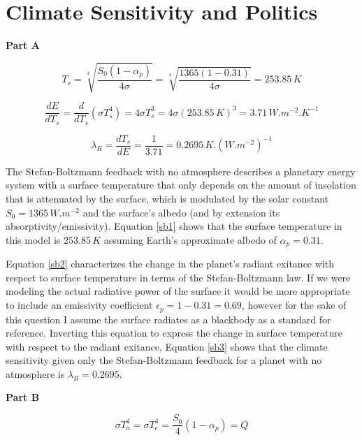\documentclass[12pt]{article}
\begin{document}
\section{Climate Sensitivity and Politics}

\noindent\textbf{Part A}

\begin{equation}\label{sb1}
    T_s = \sqrt[4]{\frac{S_0 (1-\alpha_p)}{4 \sigma}} = \sqrt[4]{\frac{1365 (1-0.31)}{4 \sigma}} = 253.85\,\si{K}
\end{equation}

\begin{equation}\label{sb2}
    \frac{d E}{d T_s} =  \frac{d}{dT_s}(\sigma T_s^4) = 4\sigma T_s^3 = 4 \sigma (253.85\,\si{K})^3 = 3.71\,\si{W.m^{-2}.K^{-1}}
\end{equation}

\begin{equation}\label{sb3}
    \lambda_R = \frac{d T_s}{d E} = \frac{1}{3.71} = 0.2695\,\si{K.(W.m^{-2})^{-1}}
\end{equation}

The Stefan-Boltzmann feedback with no atmosphere describes a planetary energy system with a surface temperature that only depends on the amount of insolation that is attenuated by the surface, which is modulated by the solar constant $S_0 = 1365\,\si{W.m^{-2}}$ and the surface's albedo (and by extension its absorptivity/emissivity). Equation \ref{sb1} shows that the surface temperature in this model is $253.85\,\si{K}$ assuming Earth's approximate albedo of $\alpha_p = 0.31$.

Equation \ref{sb2} characterizes the change in the planet's radiant exitance with respect to surface temperature in terms of the Stefan-Boltzmann law. If we were modeling the actual radiative power of the surface it would be more appropriate to include an emissivity coefficient $\epsilon_p = 1-0.31 = 0.69$, however for the sake of this question I assume the surface radiates as a blackbody as a standard for reference. Inverting this equation to express the change in surface temperature with respect to the radiant exitance, Equation \ref{sb3} shows that the climate sensitivity given only the Stefan-Boltzmann feedback for a planet with no atmosphere is $\lambda_R = 0.2695$.

\vspace{2em}\noindent\textbf{Part B}

\begin{equation}\label{q2b1}
    \sigma T_a^4 = \sigma T_e^4 = \frac{S_0}{4}(1-\alpha_p) = Q
\end{equation}
\end{document}
